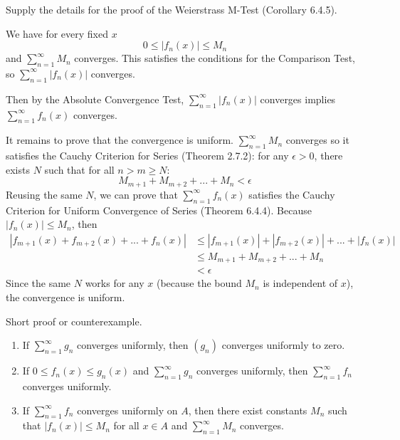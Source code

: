 \documentclass{oxmathproblems}
\begin{document}
\begin{questions}

\miquestion Supply the details for the proof of the Weierstrass M-Test (Corollary 6.4.5).
\begin{solution}
  We have for every fixed $x$
  \[0 \leq |f_{n}(x)| \leq M_{n}\]
  and $\sum_{n=1}^{\infty}M_{n}$ converges. This satisfies the conditions for the Comparison Test, so $\sum_{n=1}^{\infty}|f_{n}(x)|$ converges. 

  Then by the Absolute Convergence Test, $\sum_{n=1}^{\infty}|f_{n}(x)|$ converges implies $\sum_{n=1}^{\infty}f_{n}(x)$ converges.

  It remains to prove that the convergence is uniform. $\sum_{n=1}^{\infty}M_{n}$ converges so it satisfies the Cauchy Criterion for Series (Theorem 2.7.2):
  for any $\epsilon > 0$, there exists $N$ such that for all $n > m \geq N$:
  \[M_{m+1} + M_{m+2} + ... + M_{n} < \epsilon\]
  Reusing the same $N$, we can prove that $\sum_{n=1}^{\infty}f_{n}(x)$ satisfies the Cauchy Criterion for Uniform Convergence of Series (Theorem 6.4.4). Because
  $|f_{n}(x)| \leq M_{n}$, then
  \begin{align*}
    |f_{m+1}(x) + f_{m+2}(x) + ... + f_{n}(x)| &\leq |f_{m+1}(x)| + |f_{m+2}(x)| + ... + |f_{n}(x)|\\
    &\leq M_{m+1} + M_{m+2} + ... + M_{n}\\
    &< \epsilon 
  \end{align*}
  Since the same $N$ works for any $x$ (because the bound $M_{n}$ is independent of $x$), the convergence is uniform.
\end{solution}

\miquestion Short proof or counterexample.
\begin{enumerate}[label=(\alph*)]
  \item If $\sum_{n=1}^{\infty}g_{n}$ converges uniformly, then $(g_{n})$ converges uniformly to zero.
  \item If $0 \leq f_{n}(x) \leq g_{n}(x)$ and $\sum_{n=1}^{\infty}g_{n}$ converges uniformly, then $\sum_{n=1}^{\infty}f_{n}$ converges uniformly.
  \item If $\sum_{n=1}^{\infty}f_{n}$ converges uniformly on $A$, then there exist constants $M_{n}$ such that $|f_{n}(x)| \leq M_{n}$ for all $x \in A$
  and $\sum_{n=1}^{\infty}M_{n}$ converges.
\end{enumerate}


\end{questions}
\end{document}
